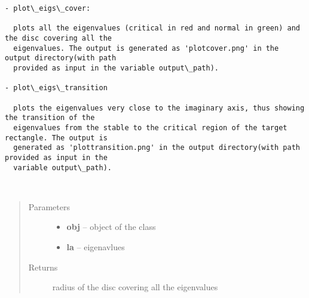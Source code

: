 \documentclass[letterpaper,10pt,english]{sphinxmanual}
\begin{document}
\begin{Verbatim}[commandchars=\\\{\}]
- plot\_eigs\_cover:

  plots all the eigenvalues (critical in red and normal in green) and the disc covering all the 
  eigenvalues. The output is generated as 'plotcover.png' in the output directory(with path 
  provided as input in the variable output\_path).

- plot\_eigs\_transition

  plots the eigenvalues very close to the imaginary axis, thus showing the transition of the 
  eigenvalues from the stable to the critical region of the target rectangle. The output is 
  generated as 'plottransition.png' in the output directory(with path provided as input in the 
  variable output\_path).
\end{Verbatim}

\begin{fulllineitems}
\label{index:brake.analyze.visual.plot_eigs_cover}~\begin{quote}\begin{description}
\item[{Parameters}] \leavevmode\begin{itemize}
\item {} 
\textbf{obj} -- object of the class 

\item {} 
\textbf{la} -- eigenavlues

\end{itemize}

\item[{Returns}] \leavevmode
radius of the disc covering all the eigenvalues

\end{description}\end{quote}

\end{fulllineitems}

\end{document}
